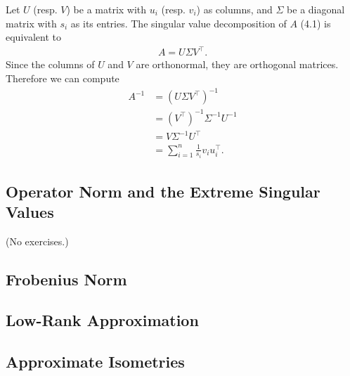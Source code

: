 \documentclass{report}
\theoremstyle{definition}
\newenvironment{exercise}[1]{
  \renewcommand\theexerciseimpl{#1}
  \exerciseimpl
}{\endexerciseimpl}
\begin{document}
\begin{exercise}{4.1.1}
  Let $U$ (resp. $V$) be a matrix with $u_i$ (resp. $v_i$) as columns, and $\Sigma$ be a diagonal matrix with $s_i$ as its entries.
  The singular value decomposition of $A$ (4.1) is equivalent to
  \begin{align*}
    A = U \Sigma V^{\top}.
  \end{align*}
  Since the columns of $U$ and $V$ are orthonormal, they are orthogonal matrices.
  Therefore we can compute
  \begin{align*}
    A^{-1} & = (U \Sigma V^{\top})^{-1} \\
    & = (V^{\top})^{-1} \Sigma^{-1} U^{-1} \\
    & = V \Sigma^{-1} U^{\top} \\
    & = \sum_{i=1}^n \frac{1}{s_i} v_i u_i^{\top}.
  \end{align*}
\end{exercise}

\subsection{Operator Norm and the Extreme Singular Values}

(No exercises.)

\subsection{Frobenius Norm}

\begin{exercise}{4.1.2}
\end{exercise}

\subsection{Low-Rank Approximation}

\begin{exercise}{4.1.3}
\end{exercise}

\subsection{Approximate Isometries}

\begin{exercise}{4.1.4}
\end{exercise}

\begin{exercise}{4.1.6}
\end{exercise}
\end{document}
